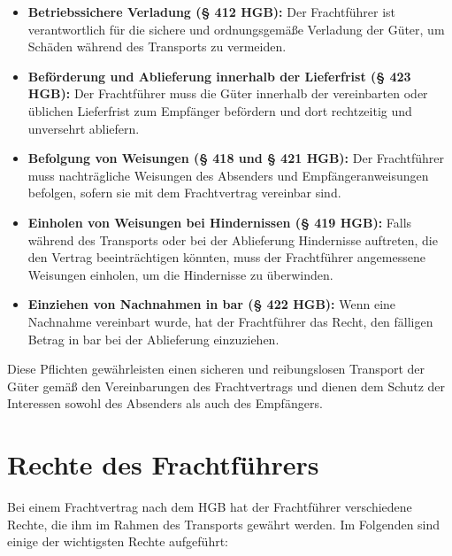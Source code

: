 \begin{itemize}
    \item \textbf{Betriebssichere Verladung (§ 412 \ac{HGB}):} Der Frachtführer ist verantwortlich für die sichere und ordnungsgemäße Verladung der Güter, um Schäden während des Transports zu vermeiden.
    \item \textbf{Beförderung und Ablieferung innerhalb der Lieferfrist (§ 423 \ac{HGB}):} Der Frachtführer muss die Güter innerhalb der vereinbarten oder üblichen Lieferfrist zum Empfänger befördern und dort rechtzeitig und unversehrt abliefern.
    \item \textbf{Befolgung von Weisungen (§ 418 und § 421 \ac{HGB}):} Der Frachtführer muss nachträgliche Weisungen des Absenders und Empfängeranweisungen befolgen, sofern sie mit dem Frachtvertrag vereinbar sind.
    \item \textbf{Einholen von Weisungen bei Hindernissen (§ 419 \ac{HGB}):} Falls während des Transports oder bei der Ablieferung Hindernisse auftreten, die den Vertrag beeinträchtigen könnten, muss der Frachtführer angemessene Weisungen einholen, um die Hindernisse zu überwinden.
    \item \textbf{Einziehen von Nachnahmen in bar (§ 422 \ac{HGB}):} Wenn eine Nachnahme vereinbart wurde, hat der Frachtführer das Recht, den fälligen Betrag in bar bei der Ablieferung einzuziehen.
\end{itemize}

Diese Pflichten gewährleisten einen sicheren und reibungslosen Transport der Güter gemäß den Vereinbarungen des Frachtvertrags und dienen dem Schutz der Interessen sowohl des Absenders als auch des Empfängers.

\section{Rechte des Frachtführers}

Bei einem Frachtvertrag nach dem \ac{HGB} hat der Frachtführer verschiedene Rechte, die ihm im Rahmen des Transports gewährt werden. Im Folgenden sind einige der wichtigsten Rechte aufgeführt:

